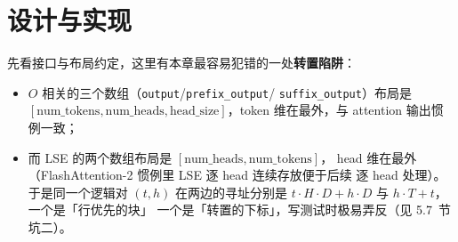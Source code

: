 \section{设计与实现}



先看接口与布局约定，这里有本章最容易犯错的一处\textbf{转置陷阱}：
\begin{itemize}
  \item $O$ 相关的三个数组（\texttt{output}/\texttt{prefix\_\allowbreak{}output}/
        \texttt{suffix\_\allowbreak{}output}）布局是 $[\text{num\_tokens}, \text{num\_heads},
        \text{head\_size}]$，token 维在最外，与 attention 输出惯例一致；
  \item 而 LSE 的两个数组布局是 $[\text{num\_heads}, \text{num\_tokens}]$，
        head 维在最外（FlashAttention-2 惯例里 LSE 逐 head 连续存放便于后续
        逐 head 处理）。于是同一个逻辑对 $(t, h)$ 在两边的寻址分别是
        $t \cdot H \cdot D + h \cdot D$ 与 $h \cdot T + t$，一个是「行优先的块」
        一个是「转置的下标」，写测试时极易弄反（见 5.7~节坑二）。
\end{itemize}

